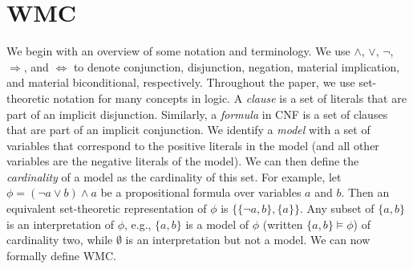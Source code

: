 

\section{WMC} %


We begin with an overview of some notation and terminology. We use $\land$,
$\lor$, $\neg$, $\Rightarrow$, and $\Leftrightarrow$ to denote conjunction,
disjunction, negation, material implication, and material biconditional,
respectively. Throughout the paper, we use set-theoretic notation for many
concepts in logic. A \emph{clause} is a set of literals that are part of an
implicit disjunction. Similarly, a \emph{formula} in CNF is a set of clauses
that are part of an implicit conjunction. We identify a \emph{model} with a set
of variables that correspond to the positive literals in the model (and all
other variables are the negative literals of the model). We can then define the
\emph{cardinality} of a model as the cardinality of this set. For example, let
$\phi = (\neg a \lor b) \land a$ be a propositional formula over variables $a$
and $b$. Then an equivalent set-theoretic representation of $\phi$ is $\{ \{
\neg a, b \}, \{ a \} \}$. Any subset of $\{ a, b \}$ is an interpretation of
$\phi$, e.g., $\{ a, b \}$ is a model of $\phi$ (written $\{ a, b \} \models
\phi$) of cardinality two, while $\emptyset$ is an interpretation but not a
model. We can now formally define WMC\@.

